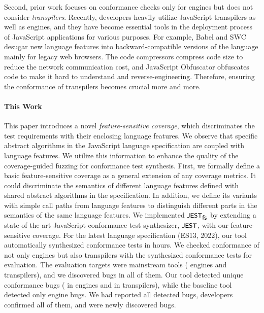 
Second, prior work focuses on conformance checks only for engines but does not
consider \textit{transpilers}.
%
Recently, developers heavily utilize JavaScript transpilers as well as engines,
and they have become essential tools in the deployment process of JavaScript
applications for various purposes.
%
For example, Babel and SWC desugar new language features into
backward-compatible versions of the language mainly for legacy web browsers.
%
The code compressors compress code size to reduce the network communication
cost, and JavaScript Obfuscator obfuscates code to make it hard to understand
and reverse-engineering.
%
Therefore, ensuring the conformance of transpilers becomes crucial more and
more.



\paragraph{\textbf{This Work}}

This paper introduces a novel \textit{feature-sensitive coverage}, which
discriminates the test requirements with their enclosing language features.
%
We observe that specific abstract algorithms in the JavaScript language
specification are coupled with language features.
%
We utilize this information to enhance the quality of the coverage-guided
fuzzing for conformance test synthesis.
%
First, we formally define a basic feature-sensitive coverage as a general
extension of any coverage metrics.
%
It could discriminate the semantics of different language features defined with
shared abstract algorithms in the specification.
%
In addition, we define its variants with simple call paths from language
features to distinguish different parts in the semantics of the same language
features.
%
We implemented $\textsf{\small JEST}_{\textsf{\small fs}}$ by extending a state-of-the-art JavaScript conformance
test synthesizer, $\textsf{\small JEST}$, with our feature-sensitive coverage.
%
For the latest language specification (ES13, 2022), our tool automatically
synthesized  conformance tests in  hours.
%
We checked conformance of not only engines but also transpilers with the
synthesized conformance tests for evaluation.
%
The evaluation targets were  mainstream tools ( engines
and  transpilers), and we discovered bugs in all of them.
%
Our tool detected  unique conformance bugs ( in engines and
 in transpilers), while the baseline tool detected only 
engine bugs.
%
We had reported all detected bugs, developers confirmed all of them, and
 were newly discovered bugs.

